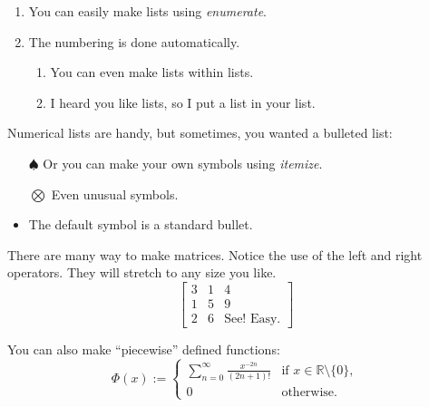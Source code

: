 

\begin{enumerate}
  \item You can easily make lists using \emph{enumerate}.
  \item The numbering is done automatically.

    \begin{enumerate}
      \item You can even make lists within lists.
      \item I heard you like lists, so I put a list in your list.
    \end{enumerate}

\end{enumerate}

Numerical lists are handy, but sometimes, you wanted a bulleted list:

\begin{itemize}
  \item[$\spadesuit$] Or you can make your own symbols using \emph{itemize}.
  \item[$\bigotimes$] Even unusual symbols.
  \item The default symbol is a standard bullet.
\end{itemize}

There are many way to make matrices.  Notice the use of the left and right operators.  They will stretch to any size you like.
\[
\left[
\begin{array}{rl|c}%
3 & 1 & 4 \\
1 & 5 & 9 \\
\hline
2 & 6 & \text{See!  Easy.}
\end{array}
\right]
\]

\noindent
You can also make ``piecewise'' defined functions:
\[
\Phi(x):=
\left\{
\begin{array}{ll}
\sum_{n=0}^\infty\frac{x^{-2n}}{(2n+1)!}  & \text{if }x\in\mathbb{R}\setminus\{0\},\\
0 & \text{otherwise.}
\end{array}
\right. 
\]

